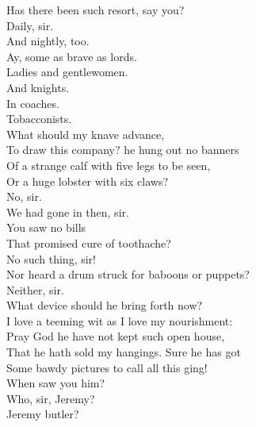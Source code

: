\documentclass[a4paper,oneside,12pt]{memoir}
\begin{document}
\begin{drama*}
\lovewitspeaks Has there been such resort, say you?\\
\neighonespeaks {} Daily, sir.\\
\neightwospeaks And nightly, too.\\
\neighthreespeaks {} Ay, some as brave as lords.\\
\neighonespeaks Ladies and gentlewomen.\\
\neighthreespeaks {} And knights.\\
\neightwospeaks {} In coaches.\\
\neighonespeaks Tobacconists.\\
\lovewitspeaks {} What should my knave advance,\\
To draw this company? he hung out no banners\\
Of a strange calf with five legs to be seen,\\
Or a huge lobster with six claws?\\
\neighthreespeaks {} No, sir.\\
\neightwospeaks We had gone in then, sir.\\
\lovewitspeaks {} You saw no bills\\
That promised cure of toothache?\\
\neightwospeaks {} No such thing, sir!\\
\lovewitspeaks Nor heard a drum struck for baboons or puppets?\\
\neighonespeaks Neither, sir.\\
\lovewitspeaks {} What device should he bring forth now?\\
I love a teeming wit as I love my nourishment:\\
Pray God he have not kept such open house,\\
That he hath sold my hangings. Sure he has got\\
Some bawdy pictures to call all this ging!\\
When saw you him?\\
\neighonespeaks {} Who, sir, Jeremy?\\
\neightwospeaks {} Jeremy butler?\\

\end{drama*}
\end{document}

